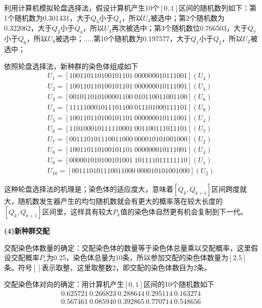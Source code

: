             利用计算机模拟轮盘选择法，假设计算机产生10个$[0,1]$区间的随机数列如下：第1个随机数为0.301431，大于$Q_3$小于$Q_4$，所以$U_4$被选中；第2个随机数为0.322062，大于$Q_3$小于$Q_4$，所以$U_4$再次被选中；第3个随机数位0.766503，大于$Q_7$小于$Q_6$，所以$U_8$被选中；$.....$第10个随机数为0.197577，大于$Q_1$小于$Q_2$，所以$U_2$被选中；
            \par
            依照轮盘选择法，新种群的染色体组成如下
            \begin{align*}
            U_1 = [100110110100101101\ 000000010111001](U_4)\\
            U_2 = [100110110100101101\ 000000010111001](U_4)\\
            U_3 = [001011010100001100\ 010110011001100](U_8)\\
            U_4 = [111110001011101100\ 011101000111101](U_9)\\
            U_5 = [100110110100101101\ 000000010111001](U_4)\\
            U_6 = [110100010111110001\ 001100111011101](U_7)\\
            U_7 = [001110101110011000\ 000010101001000](U_2)\\
            U_8 = [100110110100101101\ 000000010111001](U_4)\\
            U_9 = [000001010100101001\ 101111011111110](U_1)\\
            U_{10} = [001110101110011000\ 000010101001000](U_2)
            \end{align*}
            \par
            这种轮盘选择法的机理是；染色体的适应度大，意味着$[Q_k,Q_{k+1}]$区间跨度就大，随机数发生器产生的均匀随机数就会有更大的概率落在较大长度的$[Q_k,Q_{k+1}]$区间里，这样具有较大$P_k$值的染色体自然更有机会复制到下一代。
            \par
            \textbf{(4)新种群交配}
            \par
            交配染色体数量的确定：交配染色体的数量等于染色体总量乘以交配概率，这里假设交配概率$P_c$为0.25，染色体总量为10条，所以参加交配的染色体数量为$[2.5]$条。符号$[]$表示取整，这里取整数2，即交配的染色体数目为2条。
            \par
            交配染色体对向的确定：用计算机产生$[0,1]$区间的10个随机数如下
            \begin{align*}
            0.625721\ 0.266823 \ 0.288644 \ 0.295114 \ 0.163274 \\
            0.567461 \ 0.085940 \ 0.392865 \ 0.770714 \ 0.548656
            \end{align*}

